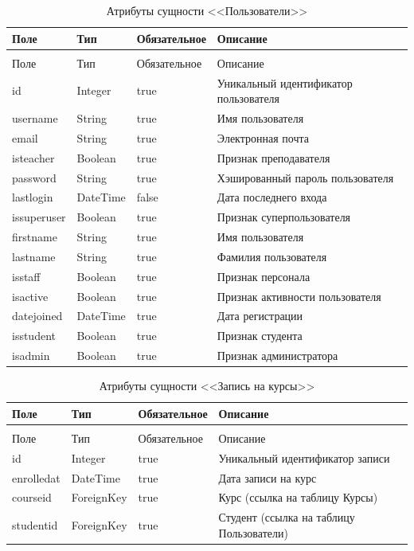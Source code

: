 \begin{xltabular}{\textwidth}{|l|l|p{3.2cm}|X|}
	\caption{Атрибуты сущности <<Пользователи>>\label{users:table}}\\ \hline
	Поле & Тип & Обязательное & Описание \\ \hline
	\endfirsthead
	\\ \hline
	Поле & Тип & Обязательное & Описание \\ \hline
	\endhead
	id & Integer & true & Уникальный идентификатор пользователя \\ \hline
	username & String & true & Имя пользователя \\ \hline
	email & String & true & Электронная почта \\ \hline
	isteacher & Boolean & true & Признак преподавателя \\ \hline
	password & String & true & Хэшированный пароль пользователя \\ \hline
	lastlogin & DateTime & false & Дата последнего входа \\ \hline
	issuperuser & Boolean & true & Признак суперпользователя \\ \hline
	firstname & String & true & Имя пользователя \\ \hline
	lastname & String & true & Фамилия пользователя \\ \hline
	isstaff & Boolean & true & Признак персонала \\ \hline
	isactive & Boolean & true & Признак активности пользователя \\ \hline
	datejoined & DateTime & true & Дата регистрации \\ \hline
	isstudent & Boolean & true & Признак студента \\ \hline
	isadmin & Boolean & true & Признак администратора \\ \hline
\end{xltabular}

\begin{xltabular}{\textwidth}{|l|l|p{3.2cm}|X|}
	\caption{Атрибуты сущности <<Запись на курсы>>\label{enrollments:table}}\\ \hline
	Поле & Тип & Обязательное & Описание \\ \hline
	\endfirsthead
	\\ \hline
	Поле & Тип & Обязательное & Описание \\ \hline
	\endhead
	id & Integer & true & Уникальный идентификатор записи \\ \hline
	enrolledat & DateTime & true & Дата записи на курс \\ \hline
	courseid & ForeignKey & true & Курс (ссылка на таблицу Курсы) \\ \hline
	studentid & ForeignKey & true & Студент (ссылка на таблицу Пользователи) \\ \hline
\end{xltabular}

